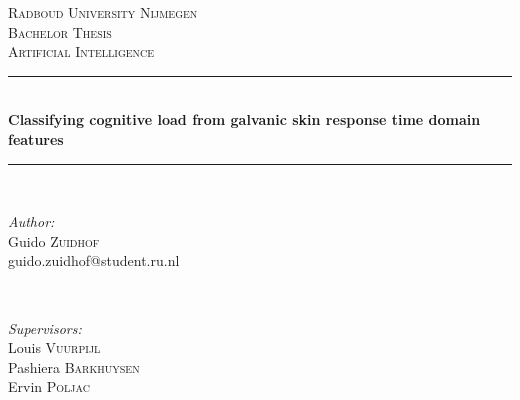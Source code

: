 \documentclass[11pt,leqno,letterpaper]{report} %
\begin{document}
\begin{titlepage}

\newcommand{\HRule}{\rule{\linewidth}{0.5mm}} %

\center %
 

\textsc{\LARGE Radboud University Nijmegen}\\[1.5cm] %
\textsc{\Large Bachelor Thesis}\\[0.5cm] %
\textsc{\large Artificial Intelligence}\\[0.5cm] %


\HRule \\[0.4cm]
{ \huge \bfseries Classifying cognitive load from galvanic skin response time domain features}\\[0.4cm] %
\HRule \\[1.5cm]
 

\begin{minipage}{0.4\textwidth}
\begin{flushleft} \large
\emph{Author:}\\
Guido \textsc{Zuidhof} %
\\\small{guido.zuidhof@student.ru.nl}
\end{flushleft}
\end{minipage}
~
\begin{minipage}{0.4\textwidth}
\begin{flushright} \large
\emph{Supervisors:} \\
Louis \textsc{Vuurpijl}\\ 
Pashiera \textsc{Barkhuysen}\\
Ervin \textsc{Poljac}
\end{flushright}
\end{minipage}\\[4cm]


\end{titlepage}
\end{document}
